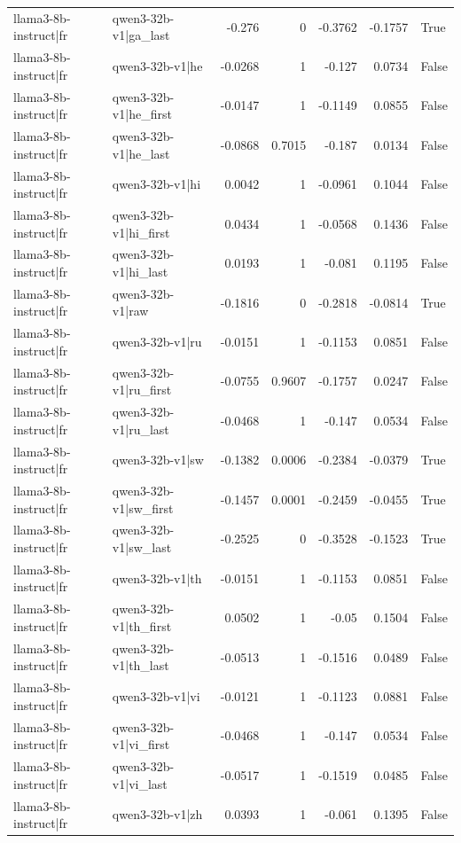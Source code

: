 \begin{table}
\begin{tabular}{l l r r r r l}
llama3-8b-instruct|fr & qwen3-32b-v1|ga_last & -0.276 & 0 & -0.3762 & -0.1757 & True \\
llama3-8b-instruct|fr & qwen3-32b-v1|he & -0.0268 & 1 & -0.127 & 0.0734 & False \\
llama3-8b-instruct|fr & qwen3-32b-v1|he_first & -0.0147 & 1 & -0.1149 & 0.0855 & False \\
llama3-8b-instruct|fr & qwen3-32b-v1|he_last & -0.0868 & 0.7015 & -0.187 & 0.0134 & False \\
llama3-8b-instruct|fr & qwen3-32b-v1|hi & 0.0042 & 1 & -0.0961 & 0.1044 & False \\
llama3-8b-instruct|fr & qwen3-32b-v1|hi_first & 0.0434 & 1 & -0.0568 & 0.1436 & False \\
llama3-8b-instruct|fr & qwen3-32b-v1|hi_last & 0.0193 & 1 & -0.081 & 0.1195 & False \\
llama3-8b-instruct|fr & qwen3-32b-v1|raw & -0.1816 & 0 & -0.2818 & -0.0814 & True \\
llama3-8b-instruct|fr & qwen3-32b-v1|ru & -0.0151 & 1 & -0.1153 & 0.0851 & False \\
llama3-8b-instruct|fr & qwen3-32b-v1|ru_first & -0.0755 & 0.9607 & -0.1757 & 0.0247 & False \\
llama3-8b-instruct|fr & qwen3-32b-v1|ru_last & -0.0468 & 1 & -0.147 & 0.0534 & False \\
llama3-8b-instruct|fr & qwen3-32b-v1|sw & -0.1382 & 0.0006 & -0.2384 & -0.0379 & True \\
llama3-8b-instruct|fr & qwen3-32b-v1|sw_first & -0.1457 & 0.0001 & -0.2459 & -0.0455 & True \\
llama3-8b-instruct|fr & qwen3-32b-v1|sw_last & -0.2525 & 0 & -0.3528 & -0.1523 & True \\
llama3-8b-instruct|fr & qwen3-32b-v1|th & -0.0151 & 1 & -0.1153 & 0.0851 & False \\
llama3-8b-instruct|fr & qwen3-32b-v1|th_first & 0.0502 & 1 & -0.05 & 0.1504 & False \\
llama3-8b-instruct|fr & qwen3-32b-v1|th_last & -0.0513 & 1 & -0.1516 & 0.0489 & False \\
llama3-8b-instruct|fr & qwen3-32b-v1|vi & -0.0121 & 1 & -0.1123 & 0.0881 & False \\
llama3-8b-instruct|fr & qwen3-32b-v1|vi_first & -0.0468 & 1 & -0.147 & 0.0534 & False \\
llama3-8b-instruct|fr & qwen3-32b-v1|vi_last & -0.0517 & 1 & -0.1519 & 0.0485 & False \\
llama3-8b-instruct|fr & qwen3-32b-v1|zh & 0.0393 & 1 & -0.061 & 0.1395 & False \\

\end{tabular}
\end{table}
